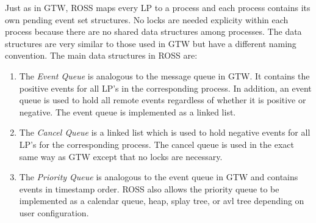 \documentclass[11pt]{book}
\begin{document}
Just as in GTW, ROSS maps every LP to a process and each process contains its own pending
event set structures. No locks are needed explicity within each process because there are
no shared data structures among processes. The data structures are very similar to those
used in GTW but have a different naming convention. The main data structures in ROSS are:

\begin{enumerate}
    \item The \emph{Event Queue} is analogous to the message queue in GTW. It contains the
        positive events for all LP's in the corresponding process. In addition, an event
        queue is used to hold all remote events regardless of whether it is positive or
        negative. The event queue is implemented as a linked list.
    \item The \emph{Cancel Queue} is a linked list which is used to hold negative events
        for all LP's for the corresponding process. The cancel queue is used in the exact
        same way as GTW except that no locks are necessary.
    \item The \emph{Priority Queue} is analogous to the event queue in GTW and contains
        events in timestamp order. ROSS also allows the priority queue to be implemented
        as a calendar queue, heap, splay tree, or avl tree depending on user configuration.
\end{enumerate}

\noindent



\end{document}

